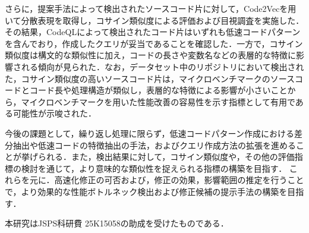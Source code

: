 \documentclass[submit,techrep,noauthor]{ipsj}
\begin{document}
さらに，提案手法によって検出されたソースコード片に対して，Code2Vecを用いて分散表現を取得し，コサイン類似度による評価および目視調査を実施した．その結果，CodeQLによって検出されたコード片はいずれも低速コードパターンを含んでおり，作成したクエリが妥当であることを確認した．一方で，コサイン類似度は構文的な類似性に加え，コードの長さや変数名などの表層的な特徴に影響される傾向が見られた．なお，データセット中のリポジトリにおいて検出された，コサイン類似度の高いソースコード片は，マイクロベンチマークのソースコードとコード長や処理構造が類似し，表層的な特徴による影響が小さいことから，マイクロベンチマークを用いた性能改善の容易性を示す指標として有用である可能性が示唆された．

今後の課題として，繰り返し処理に限らず，低速コードパターン作成における差分抽出や低速コードの特徴抽出の手法，およびクエリ作成方法の拡張を進めることが挙げられる．また，検出結果に対して，コサイン類似度や，その他の評価指標の検討を通じて，より意味的な類似性を捉えられる指標の構築を目指す．
これらを元に．高速化修正の可否および，修正の効果，影響範囲の推定を行うことで，より効果的な性能ボトルネック検出および修正候補の提示手法の構築を目指す．

\begin{acknowledgment}
本研究はJSPS科研費 25K15058の助成を受けたものである．
\end{acknowledgment}



\end{document}
